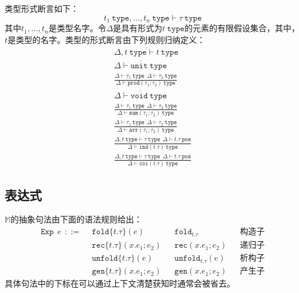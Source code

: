 类型形式断言如下：$$t_1\ \texttt{type},\dots,t_n\ \texttt{type}\vdash\tau\ \texttt{type}$$
其中$t_1,\dots,t_n$是类型名字。令$\Delta$是具有形式为$t\ \texttt{type}$的元素的有限假设集合，其中，
$t$是类型的名字。类型的形式断言由下列规则归纳定义：
\begin{subequations}
	\begin{gather}
	\overline{\Delta,t\ \texttt{type}\vdash t\ \texttt{type}} \\
	\overline{\Delta\vdash\texttt{unit}\ \texttt{type}} \\
	\frac{\Delta\vdash\tau_1\ \texttt{type}\ \ \Delta\vdash\tau_2\ \texttt{type}}
	{\Delta\vdash\texttt{prod}(\tau_1;\tau_2)\ \texttt{type}} \\
	\overline{\Delta\vdash\texttt{void}\ \texttt{type}} \\
	\frac{\Delta\vdash\tau_1\ \texttt{type}\ \ \Delta\vdash\tau_2\ \texttt{type}}
	{\Delta\vdash\texttt{sum}(\tau_1;\tau_2)\ \texttt{type}} \\
	\frac{\Delta\vdash\tau_1\ \texttt{type}\ \ \Delta\vdash\tau_2\ \texttt{type}}
	{\Delta\vdash\texttt{arr}(\tau_1;\tau_2)\ \texttt{type}} \\
	\frac{\Delta,t\ \texttt{type}\vdash\tau\ \texttt{type}\ \ \Delta\vdash t.\tau\ \texttt{pos}}
	{\Delta\vdash\texttt{ind}(t.\tau)\ \texttt{type}} \\
	\frac{\Delta,t\ \texttt{type}\vdash\tau\ \texttt{type}\ \ \Delta\vdash t.\tau\ \texttt{pos}}
	{\Delta\vdash\texttt{coi}(t.\tau)\ \texttt{type}}
	\end{gather}
\end{subequations}

\subsection{表达式}
$\mathbb{M}$的抽象句法由下面的语法规则给出：
\begin{align*}
	\texttt{Exp}\ \ e\ \ ::=\ \ &\texttt{fold}\{t.\tau\}(e) & &\texttt{fold}_{t.\tau} & &\text{构造子} \\
	&\texttt{rec}\{t.\tau\}(x.e_1;e_2) & &\texttt{rec}(x.e_1;e_2) & &\text{递归子} \\
	&\texttt{unfold}\{t.\tau\}(e) & &\texttt{unfold}_{t.\tau}(e) & &\text{析构子} \\
	&\texttt{gen}\{t.\tau\}(x.e_1;e_2) & &\texttt{gen}(x.e_1;e_2) & &\text{产生子} 
\end{align*}
具体句法中的下标在可以通过上下文清楚获知时通常会被省去。

